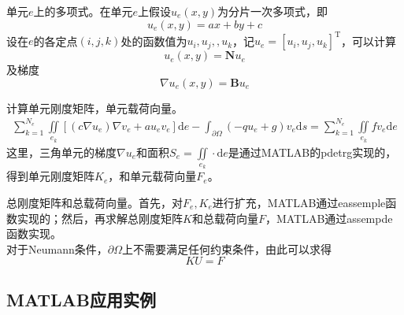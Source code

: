         \par
        单元$e$上的多项式。在单元$e$上假设$u_e(x,y)$为分片一次多项式，即
        \[
            u_e(x,y) = ax+by+c
        \]
        设在$e$的各定点$(i,j,k)$处的函数值为$u_i,u_j,,u_k$，记$u_e = [u_i,u_j,u_k]^\mathrm{T}$，可以计算
        \[
            u_e(x,y) = \mathbf{N} u_e
        \]
        及梯度
        \[
            \nabla u_e(x,y) = \mathbf{B}u_e
        \]
        \par
        计算单元刚度矩阵，单元载荷向量。
        \begin{align*}
            \sum_{k = 1}^{N_e} \iint\limits_{e_k} [(c\nabla u_e)\nabla v_e+au_ev_e]\mathrm{d}e - \int_{\partial \Omega}(-q u_e+g)v_e \mathrm{d}s = \sum_{k = 1}^{N_e}\iint\limits_{e_k} fv_e \mathrm{d}e
        \end{align*}
        这里，三角单元的梯度$\nabla u_e$和面积$S_e = \iint\limits_{e_k} \cdot \mathrm{d}e$是通过MATLAB的pdetrg实现的，得到单元刚度矩阵$K_e$，和单元载荷向量$F_e$。
        \par
        总刚度矩阵和总载荷向量。首先，对$F_e,K_e$进行扩充，MATLAB通过eassemple函数实现的；然后，再求解总刚度矩阵$K$和总载荷向量$F$，MATLAB通过assempde函数实现。\\
        对于Neumann条件，$\partial \Omega$上不需要满足任何约束条件，由此可以求得
        \[
            KU = F
        \]

    \subsection{MATLAB应用实例}
